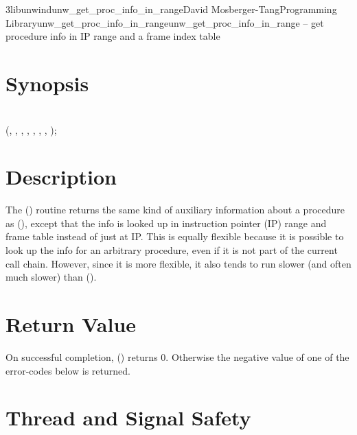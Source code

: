 \documentclass{article}
\begin{document}
\begin{Name}{3libunwind}{unw\_get\_proc\_info\_in\_range}{David Mosberger-Tang}{Programming Library}{unw\_get\_proc\_info\_in\_range}unw\_get\_proc\_info\_in\_range -- get procedure info in IP range and a frame index table
\end{Name}

\section{Synopsis}

\\

 (, , , , , , , );\\

\section{Description}

The () routine returns the same
kind of auxiliary information about a procedure as
(), except that the info is looked up in
instruction pointer (IP) range and frame table instead of just at IP.  This
is equally flexible because it is possible to look up the info for an arbitrary
procedure, even if it is not part of the current call chain.  However, since it
is more flexible, it also tends to run slower (and often much slower)
than ().

\section{Return Value}

On successful completion, ()
returns 0.  Otherwise the negative value of one of the error-codes
below is returned.

\section{Thread and Signal Safety}
\end{document}
